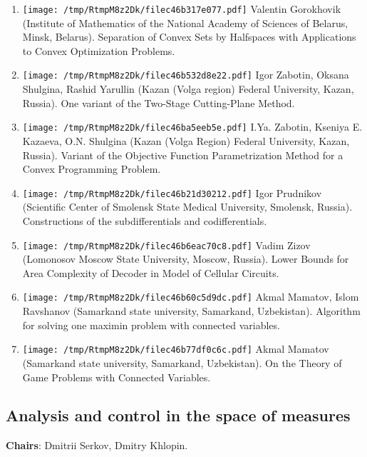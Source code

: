 \documentclass[
]{article}
\providecommand{\tightlist}{%
  \setlength{\itemsep}{0pt}\setlength{\parskip}{0pt}}
\begin{document}
\begin{enumerate}
\def\labelenumi{\arabic{enumi}.}
\tightlist
\item
  \protect\texttt{[image: /tmp/RtmpM8z2Dk/filec46b317e077.pdf]}
  Valentin Gorokhovik (Institute of Mathematics of the National Academy
  of Sciences of Belarus, Minsk, Belarus). Separation of Convex Sets by
  Halfspaces with Applications to Convex Optimization Problems.
\item
  \protect\texttt{[image: /tmp/RtmpM8z2Dk/filec46b532d8e22.pdf]}
  Igor Zabotin, Oksana Shulgina, Rashid Yarullin (Kazan (Volga region)
  Federal University, Kazan, Russia). One variant of the Two-Stage
  Cutting-Plane Method.
\item
  \protect\texttt{[image: /tmp/RtmpM8z2Dk/filec46ba5eeb5e.pdf]}
  I.Ya. Zabotin, Kseniya E. Kazaeva, O.N. Shulgina (Kazan (Volga Region)
  Federal University, Kazan, Russia). Variant of the Objective Function
  Parametrization Method for a Convex Programming Problem.
\item
  \protect\texttt{[image: /tmp/RtmpM8z2Dk/filec46b21d30212.pdf]}
  Igor Prudnikov (Scientific Center of Smolensk State Medical
  University, Smolensk, Russia). Constructions of the subdifferentials
  and codifferentials.
\item
  \protect\texttt{[image: /tmp/RtmpM8z2Dk/filec46b6eac70c8.pdf]}
  Vadim Zizov (Lomonosov Moscow State University, Moscow, Russia). Lower
  Bounds for Area Complexity of Decoder in Model of Cellular Circuits.
\item
  \protect\texttt{[image: /tmp/RtmpM8z2Dk/filec46b60c5d9dc.pdf]}
  Akmal Mamatov, Islom Ravshanov (Samarkand state university, Samarkand,
  Uzbekistan). Algorithm for solving one maximin problem with connected
  variables.
\item
  \protect\texttt{[image: /tmp/RtmpM8z2Dk/filec46b77df0c6c.pdf]}
  Akmal Mamatov (Samarkand state university, Samarkand, Uzbekistan). On
  the Theory of Game Problems with Connected Variables.
\end{enumerate}

\hypertarget{meas}{%
\subsection{Analysis and control in the space of measures}\label{meas}}

\textbf{Chairs}: Dmitrii Serkov, Dmitry Khlopin.
\end{document}
